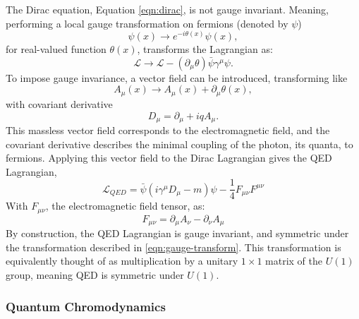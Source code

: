         The Dirac equation, Equation \ref{eqn:dirac}, is not gauge invariant. Meaning, performing a local gauge transformation on fermions (denoted by $\psi$)
        \begin{equation} \label{eqn:gauge-transform}
            \psi(x) \rightarrow e^{-i\theta(x)}\psi(x),
        \end{equation}        
        for real-valued function $\theta(x)$, transforms the Lagrangian as:
        \begin{equation}
            \mathcal{L} \rightarrow \mathcal{L} - (\partial_{\mu}\theta)\bar{\psi}\gamma^{\mu}\psi.
        \end{equation}
        To impose gauge invariance, a vector field can be introduced, transforming like
        \begin{equation}
            A_{\mu}(x) \rightarrow A_{\mu}(x) + \partial_{\mu}\theta(x),
        \end{equation}
        with covariant derivative
        \begin{equation}
            D_{\mu} = \partial_{\mu} + iqA_{\mu}.
        \end{equation}
        This massless vector field corresponds to the electromagnetic field, and the covariant derivative describes the minimal coupling of the photon, its quanta, to fermions. Applying this vector field to the Dirac Lagrangian gives the \gls{QED} Lagrangian,
        \begin{equation}
            \mathcal{L}_{QED} = \bar{\psi} (i \gamma^{\mu} D_{\mu} - m)\psi - \frac{1}{4} F_{\mu \nu}F^{\mu \nu}
        \end{equation}
        With $F_{\mu \nu}$, the electromagnetic field tensor, as:
        \begin{equation}
        F_{\mu \nu} = \partial_{\mu}A_{\nu} - \partial_{\nu}A_{\mu}
        \end{equation}
        By construction, the \gls{QED} Lagrangian is gauge invariant, and symmetric under the transformation described in \ref{eqn:gauge-transform}. This transformation is equivalently thought of as multiplication by a unitary $1 \times 1$ matrix of the $U(1)$ group, meaning \gls{QED} is symmetric under $U(1)$.


        \subsubsection{Quantum Chromodynamics} \label{sssec:QCD}

